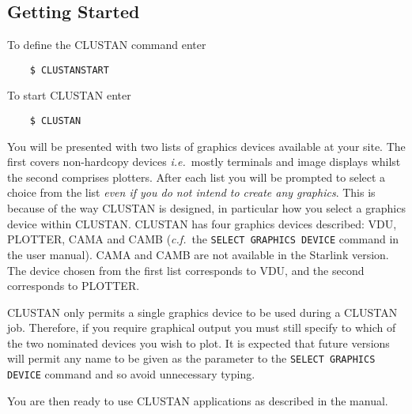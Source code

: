 \subsection{Getting Started}
To define the {\small CLUSTAN} command enter
\begin{verbatim}
    $ CLUSTANSTART
\end{verbatim}

To start {\small CLUSTAN} enter
\begin{verbatim}
    $ CLUSTAN
\end{verbatim}
You will be presented with two lists of graphics devices available at
your site.  The first covers non-hardcopy devices  {\it i.e.}\ mostly 
terminals and image displays whilst the second comprises plotters. After each
list you will be prompted to select a choice from the list {\em even
if you do not intend to create any graphics}.  This is because of
the way {\small CLUSTAN} is designed, in particular how you select a graphics
device within {\small CLUSTAN}.  {\small CLUSTAN} has four graphics devices 
described:
VDU, PLOTTER, CAMA and CAMB ({\it c.f.}\ the {\tt SELECT GRAPHICS DEVICE}
command in the user manual).  CAMA and CAMB are not available in the
Starlink version.  The device chosen from the first list corresponds
to VDU, and the second corresponds to PLOTTER.

{\small CLUSTAN} only permits a single graphics device to be used during a
{\small CLUSTAN} job.  Therefore, if you require graphical output you must still
specify to which of the two nominated devices you wish to plot.  It is
expected that future versions will permit any name to be given as the
parameter to the {\tt SELECT GRAPHICS DEVICE} command and so avoid
unnecessary typing.

You are then ready to use {\small CLUSTAN} applications as described in the
manual.

